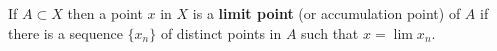 If $A \subset X$ then a point $x$ in $X$ is a \textbf{limit point} (or accumulation point) of $A$ if there is a sequence $\{x_n\}$ of distinct points in $A$ such that $x = \lim x_n$.
